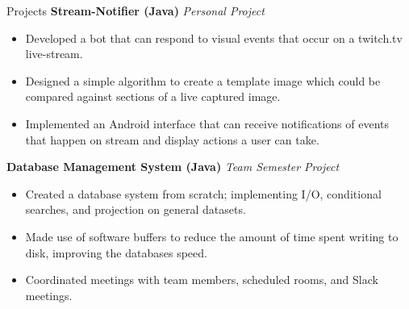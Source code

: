 \documentclass{resume} %
\begin{document}
\begin{rSection}{Projects}
{\bf Stream-Notifier (Java)} \hfill {\em Personal Project}
\begin{itemize}[noitemsep]
    \item Developed a bot that can respond to visual events that occur on a twitch.tv live-stream. 
    \item Designed a simple algorithm to create a template image which could be compared against sections of a live captured image.
    \item Implemented an Android interface that can receive notifications of events that happen on stream and display actions a user can take.
\end{itemize}

{\bf Database Management System (Java)} \hfill {\em Team Semester Project}
\begin{itemize}[noitemsep]
    \item Created a database system from scratch; implementing I/O, conditional searches, and projection on general datasets.
    \item Made use of software buffers to reduce the amount of time spent writing to disk, improving the databases speed. 
    \item Coordinated meetings with team members, scheduled rooms, and Slack meetings.
\end{itemize}


\end{rSection}
\end{document}
